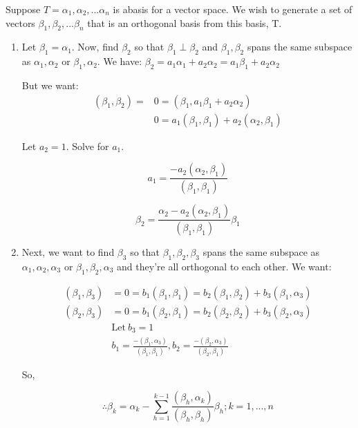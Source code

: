 Suppose $T = {\alpha_1, \alpha_2, ... \alpha_n}$ is  abasis for a vector space. We wish to generate a set of vectors ${\beta_1, \beta_2, ... \beta_n}$ that is an orthogonal basis from this basis, T.

\begin{enumerate}
  \item Let $\beta_1 = \alpha_1$. Now, find $\beta_2$ so that $\beta_1 \perp \beta_2$ and $\beta_1, \beta_2$ spans the same subspace as ${\alpha_1, \alpha_2}$ or ${\beta_1, \alpha_2}$. We have: $\beta_2 = a_1\alpha_1 + a_2\alpha_2 = a_1\beta_1 + a_2\alpha_2$

  But we want:
  \begin{align*}
    (\beta_1, \beta_2) = &0 = (\beta_1, a_1\beta_1 + a_2\alpha_2) \\ 
                         &0 = a_1(\beta_1, \beta_1) + a_2(\alpha_2, \beta_1)
  \end{align*}

  Let $a_2 = 1$. Solve for $a_1$.

  \begin{equation}
    a_1 = \frac{-a_2(\alpha_2, \beta_1)}{(\beta_1, \beta_1)}
  \end{equation}

  \begin{equation}
    \beta_2 = \frac{\alpha_2 - a_2(\alpha_2, \beta_1)}{(\beta_1, \beta_1)} \beta_1
  \end{equation}

  \item Next, we want to find $\beta_3$ so that ${\beta_1, \beta_2, \beta_3}$ spans the same subspace as ${\alpha_1, \alpha_2, \alpha_3}$ or ${\beta_1, \beta_2, \alpha_3}$ and they're all orthogonal to each other. We want:

  \begin{align*}
    (\beta_1, \beta_3) &= 0 = b_1(\beta_1, \beta_1) = b_2(\beta_1, \beta_2) + b_3(\beta_1, \alpha_3) \\
    (\beta_2, \beta_3) &= 0 = b_1(\beta_2, \beta_1) = b_2(\beta_2, \beta_2) + b_3(\beta_2, \alpha_3) \\
                       &\text{Let}\ b_3 = 1 \\
                       &b_1 = \frac{-(\beta_1, \alpha_3)}{(\beta_1, \beta_1)}, b_2 = \frac{-(\beta_2, \alpha_3)}{(\beta_2, \beta_1)}
  \end{align*}

  So,

  \begin{equation}
    \therefore \beta_k = \alpha_k - \sum_{h=1}^{k-1} \frac{(\beta_h, \alpha_k)}{(\beta_h, \beta_h)} \beta_h; k = 1, ..., n
  \end{equation}


\end{enumerate}
